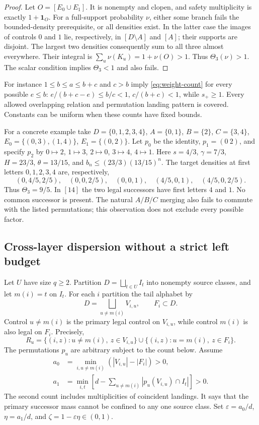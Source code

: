 \documentclass[11pt,reqno]{amsart}
\numberwithin{equation}{section}
\theoremstyle{definition}
\theoremstyle{definition}
\newcommand{\one}{\mathbf 1}
\newcommand{\eps}{\varepsilon}
\begin{document}
\begin{proof}
Let $O=[E_0\cup E_1]$. It is nonempty and clopen, and safety
multiplicity is exactly $1+\one_O$. For a full-support probability
$\nu$, either some branch fails the bounded-density prerequisite,
or all densities exist. In the latter case the images of controls
$0$ and $1$ lie, respectively, in $[D\setminus A]$ and $[A]$;
their supports are disjoint. The largest two densities consequently
sum to all three almost everywhere. Their integral is
$\sum_u\nu(K_u)=1+\nu(O)>1$. Thus $\Theta_3(\nu)>1$.
The scalar condition implies $\Theta_3<1$ and also fails.
\end{proof}

For instance
$1\le b\le a\le b+c$ and $c>b$ imply
\eqref{eq:weight-count} for every possible $e\le b$:
$e/(b+c-e)\le b/c<1$, $c/(b+c)<1$, while $s_+\ge1$.
Every allowed overlapping relation and permutation landing pattern
is covered. Constants can be uniform when these counts have fixed
bounds.

For a concrete example take
$D=\{0,1,2,3,4\}$, $A=\{0,1\}$, $B=\{2\}$,
$C=\{3,4\}$, $E_0=\{(0,3),(1,4)\}$,
$E_1=\{(0,2)\}$. Let $p_0$ be the identity,
$p_1=(0\ 2)$, and specify $p_2$ by
$0\mapsto2$, $1\mapsto3$, $2\mapsto0$, $3\mapsto4$,
$4\mapsto1$. Here $s=4/3$, $\gamma=7/3$, $H=23/3$,
$\theta=13/15$, and
$b_n\le(23/3)(13/15)^n$. The target densities at first letters
$0,1,2,3,4$ are, respectively,
\[
 (0,4/5,2/5),\quad(0,0,2/5),\quad(0,0,1),\quad
 (4/5,0,1),\quad(4/5,0,2/5).
\]
Thus $\Theta_3=9/5$. In $[14]$ the two legal successors have
first letters $4$ and $1$. No common successor is present. The
natural $A/B/C$ merging also fails to commute with the listed
permutations; this observation does not exclude every possible factor.

\subsection{Cross-layer dispersion without a strict left budget}
Let $U$ have size $q\ge2$. Partition $D=\bigsqcup_{t\in U}I_t$
into nonempty source classes, and let $m(i)=t$ on $I_t$.
For each $i$ partition the tail alphabet by
\[
 D=\bigsqcup_{u\ne m(i)}V_{i,u},\qquad F_i\subset D.
\]
Control $u\ne m(i)$ is the primary legal control on $V_{i,u}$,
while control $m(i)$ is also legal on $F_i$. Precisely,
\begin{equation}\label{eq:spread-relation}
 R_u=\{(i,z):u\ne m(i),\ z\in V_{i,u}\}
 \cup\{(i,z):u=m(i),\ z\in F_i\}.
\end{equation}
The permutations $p_u$ are arbitrary subject to the count below.
Assume
\begin{align}
 a_0&=\min_{i,u\ne m(i)}(|V_{i,u}|-|F_i|)>0,
 \label{eq:spread-size}\\
 a_1&=\min_{i,t}\left[d-
       \sum_{u\ne m(i)}|p_u(V_{i,u})\cap I_t|\right]>0.
 \label{eq:spread-land}
\end{align}
The second count includes multiplicities of coincident landings.
It says that the primary successor mass cannot be confined to any
one source class. Set $\eps=a_0/d$, $\eta=a_1/d$, and
$\zeta=1-\eps\eta\in(0,1)$.
\end{document}

